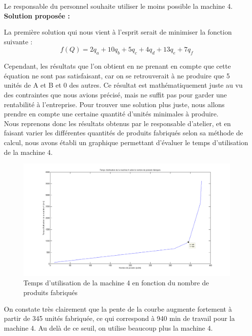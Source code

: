 \documentclass[paper=a4, fontsize=11pt]{scrartcl}
\numberwithin{equation}{section}		%
\numberwithin{figure}{section}			%
\numberwithin{table}{section}				%
\renewcommand{\bf}[1]{\textbf{#1}}
\begin{document}
Le responsable du personnel souhaite utiliser le moins possible la machine 4.\\

\bf{Solution proposée :}

La première solution qui nous vient à l’esprit serait de minimiser la fonction suivante :\[f(Q) = 2q_a + 10q_b + 5q_c + 4q_d + 13q_e + 7q_f\]

Cependant, les résultats que l’on obtient en ne prenant en compte que cette équation ne sont pas satisfaisant, car on se retrouverait à ne produire que 5 unités de A et B et 0 des autres. Ce résultat est mathématiquement juste au vu des contraintes que nous avions précisé, mais ne suffit pas pour garder une rentabilité à l’entreprise. Pour trouver une solution plus juste, nous allons prendre en compte une certaine quantité d’unités minimales à produire. \\

Nous reprenons donc les résultats obtenus par le responsable d’atelier, et en faisant varier les différentes quantités de produits fabriqués selon sa méthode de calcul, nous avons établi un graphique permettant d’évaluer le temps d’utilisation de la machine 4.\\

\begin{figure}[H]
\caption{Temps d'utilisation de la machine 4 en fonction du nombre de produits fabriqués}
\centering
\includegraphics[width=16cm]{figures/graphe-personnel.png}
\end{figure}

On constate très clairement que la pente de la courbe augmente fortement à partir de 345 unités fabriquée, ce qui correspond à 940 min de travail pour la machine 4. Au delà de ce seuil, on utilise beaucoup plus la machine 4.\\
\end{document}
